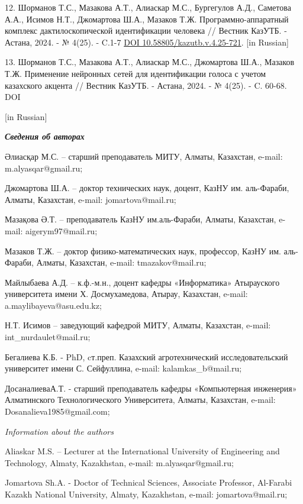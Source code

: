 \begin{references}
12. Шорманов Т.С., Мазакова А.Т., Алиаскар М.С., Бургегулов А.Д.,
Саметова А.А., Исимов Н.Т., Джомартова Ш.А., Мазаков Т.Ж.
Программно-аппаратный комплекс дактилоскопической идентификации человека
// Вестник КазУТБ. - Астана, 2024. - № 4(25). - C.1-7
\href{https://doi.org/10.58805/kazutb.v.4.25-721}{DOI
10.58805/kazutb.v.4.25-721}. {[}in Russian{]}

13. Шорманов Т.С., Мазакова А.Т., Алиаскар М.С., Джомартова Ш.А., Мазаков
Т.Ж. Применение нейронных сетей для идентификации голоса с учетом
казахского акцента // Вестник КазУТБ. - Астана, 2024. - № 4(25). - C.
60-68. DOI

{[}in Russian{]}
\end{references}

\begin{authorinfo}
\emph{{\bfseries Сведения об авторах}}

Әлиасқар М.С. -- старший преподаватель МИТУ, Алматы, Казахстан, e-mail:
m.alyasqar@gmail.ru;

Джомартова Ш.А. -- доктор технических наук, доцент, КазНУ им.
аль-Фараби, Алматы, Казахстан, e-mail: jomartova@mail.ru;

Мазақова Ә.Т. -- преподаватель КазНУ им.аль-Фараби, Алматы, Казахстан,
e-mail: aigerym97@mail.ru;

Мазаков Т.Ж. -- доктор физико-математических наук, профессор, КазНУ им.
аль-Фараби, Алматы, Казахстан, e-mail: tmazakov@mail.ru;

Майлыбаева А.Д. -- к.ф.-м.н., доцент кафедры «Информатика» Атырауского
университета имени Х. Досмухамедова, Атырау, Казахстан, e-mail:
a.maylibayeva@asu.edu.kz;

Н.Т. Исимов -- заведующий кафедрой МИТУ, Алматы, Казахстан, e-mail:
int\_nurdaulet@mail.ru;

Бегалиева К.Б. - PhD, cт.преп. Казахский агротехнический
исследовательский университет имени С. Сейфуллина, e-mail:
kalamkas\_b@mail.ru;

ДосаналиеваА.Т. - старший преподаватель кафедры «Компьютерная инженерия»
Алматинского Технологического Университета, Алматы, Казахстан, e-mail:
Dosanalieva1985@gmail.com;

\emph{Information about the authors}

Aliaskar M.S. -- Lecturer at the International University of Engineering
and Technology, Almaty, Kazakhstan, e-mail: m.alyasqar@gmail.ru;

Jomartova Sh.A. - Doctor of Technical Sciences, Associate Professor,
Al-Farabi Kazakh National University, Almaty, Kazakhstan, e-mail:
jomartova@mail.ru;


\end{authorinfo}
